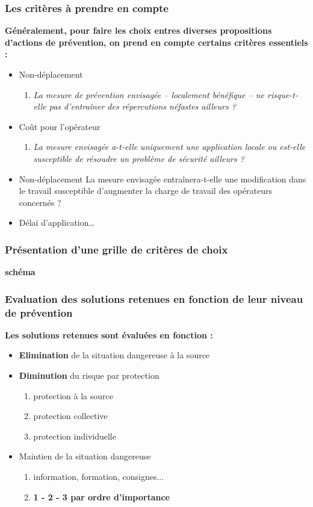 \documentclass{beamer}
\begin{document}
\begin{frame}
\frametitle{Les critères à prendre en compte}

\textbf{Généralement, pour faire les choix entres diverses propositions d’actions de prévention, on prend en compte certains critères essentiels :}
\begin{itemize}
\item Non-déplacement 
\begin{enumerate}
\item \textit{La mesure de prévention envisagée – localement bénéfique – ne risque-t-elle pas d’entraîner des répercutions néfastes ailleurs ?}
\end{enumerate}
\item Coût pour l’opérateur
\begin{enumerate}
\item \textit{La mesure envisagée a-t-elle uniquement une application locale ou est-elle susceptible de résoudre un problème de sécurité ailleurs ?}
\end{enumerate}
\item Non-déplacement La mesure envisagée entraînera-t-elle une modification dans le travail susceptible d’augmenter la charge de travail des opérateurs concernés ?
\item Délai d’application…
\end{itemize}
\end{frame}

\begin{frame}
\frametitle{Présentation d’une grille de critères de choix}

\textbf{schéma}
\end{frame}

\begin{frame}
\frametitle{Evaluation des solutions retenues en fonction de leur niveau de prévention}

\textbf{Les solutions retenues sont évaluées en fonction : }
\begin{itemize}
\item \textbf{Elimination} de la situation dangereuse à la source
\item \textbf{Diminution} du risque par protection
\begin{enumerate}
\item protection à la source
\item protection collective
\item protection individuelle
\end{enumerate}
\item Maintien de la situation dangereuse
\begin{enumerate}
\item information, formation, consignes...
\item \textbf{1 - 2 - 3 par ordre d’importance}
\end{enumerate}
\end{itemize}
\end{frame}
\end{document}
